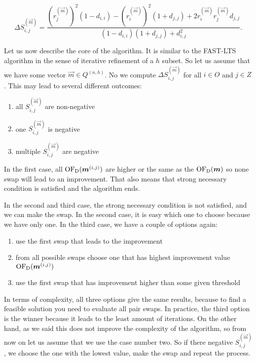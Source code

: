 \begin{equation} \label{hawkins:rovnice}
    \Delta S^{(\vec{m})}_{i,j} = 
    \frac{({r}^{(\vec{m})}_{j})^2(1-d_{i,i})- ({r}^{(\vec{m})}_{i})^2(1+d_{j,j}) + 2{r}^{(\vec{m})}_{i}{r}^{(\vec{m})}_{j}d_{j,j}}
    {(1-d_{i,i})(1+d_{j,j}) + d_{i,j}^2}.
\end{equation}

Let us now describe the core of the algorithm. It is similar to the FAST-LTS algorithm in the sense of iterative refinement of a $h$ subset. So let us assume that we have some vector  $\vec{m} \in Q^{(n,h)}$. No we compute  $\Delta S^{(\vec{m})}_{i,j}$ for all $i \in O$ and $j \in Z$. This may lead to several different outcomes:
\begin{enumerate}
    \item all $S^{(\vec{m})}_{i,j}$ are non-negative
    \item one $S^{(\vec{m})}_{i,j}$ is negative
    \item multiple $S^{(\vec{m})}_{i,j}$ are negative
\end{enumerate}

In the first case, all $\operatorname{OF_D}(\boldsymbol{m}^{(i,j)})$ are higher or the same as the $\operatorname{OF_D}(\boldsymbol{m})$ so none swap will lead to an improvement. That also means that strong necessary condition is satisfied and the algorithm ends.

In the second and third case, the strong necessary condition is not satisfied, and we can make the swap. In the second case, it is easy which one to choose because we have only one. In the third case, we have a couple of options again:
\begin{enumerate}
    \item use the first swap that leads to the improvement
    \item from all possible swaps choose one that has highest improvement value  $\operatorname{OF_D}(\boldsymbol{m}^{(i,j)})$
    \item use the first swap that has improvement higher than some given threshold
\end{enumerate}

In terms of complexity, all three options give the same results, because to find a feasible solution you need to evaluate all pair swaps. In practice, the third option is the winner because it leads to the least amount of iterations. On the other hand, as we said this does not improve the complexity of the algorithm, so from now on let us assume that we use the case number two.
So if there negative  $S^{(\vec{m})}_{i,j}$, we choose the one with the lowest value, make the swap and repeat the process.  


